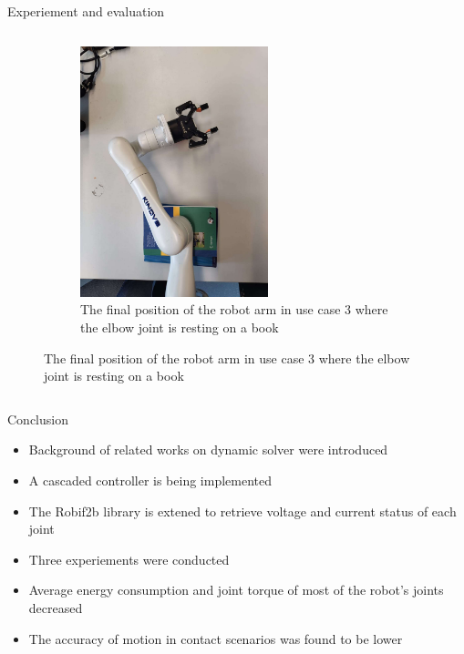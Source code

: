 \documentclass[aspectratio=169]{beamer}
\begin{document}
\begin{frame}{Experiement and evaluation}
\begin{columns}[c]
\begin{column}{.5\textwidth}
\begin{figure}
\begin{figure}
          \includegraphics[width=0.6\textwidth]{images/us3_final.jpg}
          \caption{The final position of the robot arm in use case 3 where the elbow joint is resting on a book}
        \end{figure}
      \end{figure}
      \end{column}
      \end{columns}
  \end{frame}

  \begin{frame}{Conclusion}
    \begin{itemize}
      \item Background of related works on dynamic solver were introduced
      \item A cascaded controller is being implemented
      \item The Robif2b library is extened to retrieve voltage and current status of each joint
      \item Three experiements were conducted
      \item Average energy consumption and joint torque of most of the robot’s joints \alert{decreased}
      \item The accuracy of motion in contact scenarios was found to be \alert{lower}
    \end{itemize}
  \end{frame}
\end{document}
